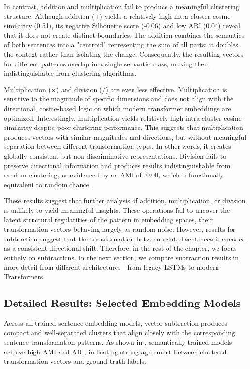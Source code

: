 In contrast, addition and multiplication fail to produce a meaningful clustering structure. Although addition ($+$) yields a relatively high intra-cluster cosine similarity (0.51), its negative Silhouette score (-0.06) and low ARI (0.04) reveal that it does not create distinct boundaries. The addition combines the semantics of both sentences into a "centroid" representing the sum of all parts; it doubles the context rather than isolating the change. Consequently, the resulting vectors for different patterns overlap in a single semantic mass, making them indistinguishable from clustering algorithms.

Multiplication ($\times$) and division ($/$) are even less effective. Multiplication is sensitive to the magnitude of specific dimensions and does not align with the directional, cosine-based logic on which modern transformer embeddings are optimized. Interestingly, multiplication yields relatively high intra-cluster cosine similarity despite poor clustering performance. This suggests that multiplication produces vectors with similar magnitudes and directions, but without meaningful separation between different transformation types. In other words, it creates globally consistent but non-discriminative representations. Division fails to preserve directional information and produces results indistinguishable from random clustering, as evidenced by an AMI of -0.00, which is functionally equivalent to random chance.

These results suggest that further analysis of addition, multiplication, or division is unlikely to yield meaningful insights.
These operations fail to uncover the latent structural regularities of the pattern in embedding spaces, their transformation vectors behaving largely as random noise. However, results for subtraction suggest that the transformation between related sentences is encoded as a consistent directional shift. Therefore, in the rest of the chapter, we focus entirely on subtractions. In the next section, we compare subtraction results in more detail from different architectures—from legacy LSTMs to modern Transformers. 

\subsection{Detailed Results: Selected Embedding Models}

Across all trained sentence embedding models, vector subtraction produces compact and well-separated clusters that align closely with the corresponding sentence transformation patterns. As shown in , semantically trained models achieve high AMI and ARI, indicating strong agreement between clustered transformation vectors and ground-truth labels. 


